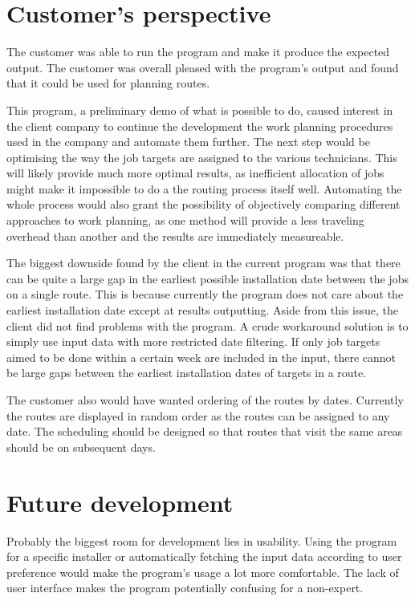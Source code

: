 \section{Customer's perspective}

The customer was able to run the program and make it produce the expected output. The customer was overall pleased with the program's output and found that it could be used for planning routes. 

This program, a preliminary demo of what is possible to do, caused interest in the client company to continue the development the work planning procedures used in the company and automate them further. The next step would be optimising the way the job targets are assigned to the various technicians. This will likely provide much more optimal results, as inefficient allocation of jobs might make it impossible to do a the routing process itself well. Automating the whole process would also grant the possibility of objectively comparing different approaches to work planning, as one method will provide a less traveling overhead than another and the results are immediately measureable.   

The biggest downside found by the client in the current program was that there can be quite a large gap in the earliest possible installation date between the jobs on a single route. This is because currently the program does not care about the earliest installation date except at results outputting. Aside from this issue, the client did not find problems with the program. A crude workaround solution is to simply use input data with more restricted date filtering. If only job targets aimed to be done within a certain week are included in the input, there cannot be large gaps between the earliest installation dates of targets in a route.

The customer also would have wanted ordering of the routes by dates. Currently the routes are displayed in random order as the routes can be assigned to any date. The scheduling should be designed so that routes that visit the same areas should be on subsequent days.



\section{Future development}

Probably the biggest room for development lies in usability. Using the program for a specific installer or automatically fetching the input data according to user preference would make the program's usage a lot more comfortable. The lack of user interface makes the program potentially confusing for a non-expert.


